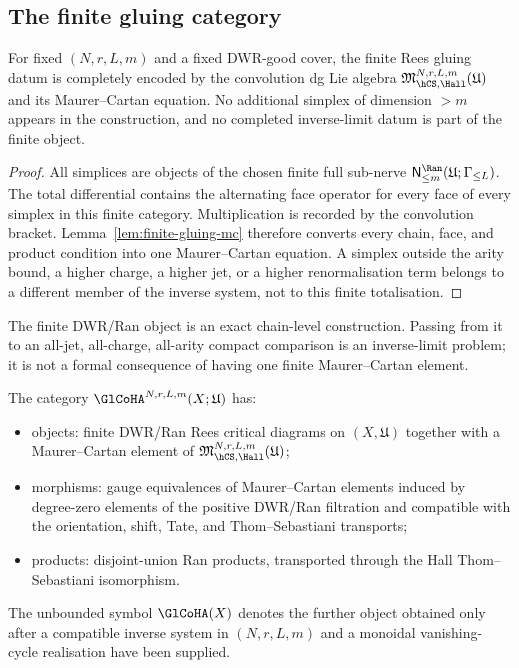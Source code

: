 \subsection{The finite gluing category}
\label{sec:glue-2cat}

\begin{proposition}
\label{prop:glcoha-truncation-forced}
For fixed $(N,r,L,m)$ and a fixed DWR-good cover, the finite Rees
gluing datum is completely encoded by the convolution dg Lie algebra
$\mathfrak M_{\hCS,\Hall}^{N,r,L,m}(\mathfrak U)$ and its
Maurer--Cartan equation. No additional simplex of dimension
$>m$ appears in the construction, and no completed inverse-limit datum
is part of the finite object.
\end{proposition}

\begin{proof}
All simplices are objects of the chosen finite full sub-nerve
$\mathsf N^{\Ran}_{\le m}(\mathfrak U;\Gamma_{\le L})$.
The total differential contains the alternating face operator for every
face of every simplex in this finite category. Multiplication is
recorded by the convolution bracket. Lemma~\ref{lem:finite-gluing-mc}
therefore converts every chain, face, and product condition into one
Maurer--Cartan equation. A simplex outside the arity bound, a higher
charge, a higher jet, or a higher renormalisation term belongs to a
different member of the inverse system, not to this finite
totalisation.
\end{proof}

\begin{remark}
\label{rem:truncation-property-not-choice}
The finite DWR/Ran object is an exact chain-level construction. Passing
from it to an all-jet, all-charge, all-arity compact comparison is an
inverse-limit problem; it is not a formal consequence of having one
finite Maurer--Cartan element.
\end{remark}

\begin{definition}
\label{def:glue-2cat}
The category $\GlCoHA^{N,r,L,m}(X;\mathfrak U)$ has:
\begin{itemize}
\item objects: finite DWR/Ran Rees critical diagrams on
 $(X,\mathfrak U)$ together with a Maurer--Cartan element of
 $\mathfrak M_{\hCS,\Hall}^{N,r,L,m}(\mathfrak U)$;
\item morphisms: gauge equivalences of Maurer--Cartan elements induced
 by degree-zero elements of the positive DWR/Ran filtration and
 compatible with the orientation, shift, Tate, and
 Thom--Sebastiani transports;
\item products: disjoint-union Ran products, transported through the
 Hall Thom--Sebastiani isomorphism.
\end{itemize}
The unbounded symbol $\GlCoHA(X)$ denotes the further object obtained
only after a compatible inverse system in $(N,r,L,m)$ and a monoidal
vanishing-cycle realisation have been supplied.
\end{definition}

